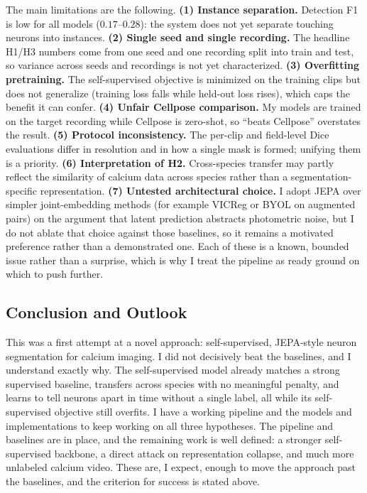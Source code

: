\documentclass[twoside,11pt]{article}
\begin{document}
The main limitations are the following. \textbf{(1) Instance separation.} Detection F1 is low for all
models ($0.17$--$0.28$): the system does not yet separate touching neurons into instances. \textbf{(2) Single seed and
single recording.} The headline H1/H3 numbers come from one seed and one recording split into train
and test, so variance across seeds and recordings is not yet characterized. \textbf{(3) Overfitting
pretraining.} The self-supervised objective is minimized on the training clips but does not generalize
(training loss falls while held-out loss rises), which caps the benefit it can confer. \textbf{(4) Unfair Cellpose comparison.} My models
are trained on the target recording while Cellpose is zero-shot, so ``beats Cellpose'' overstates the
result. \textbf{(5) Protocol inconsistency.} The per-clip and field-level Dice evaluations differ in
resolution and in how a single mask is formed; unifying them is a priority. \textbf{(6) Interpretation
of H2.} Cross-species transfer may partly reflect the similarity of calcium data across species rather
than a segmentation-specific representation. \textbf{(7) Untested architectural choice.} I adopt JEPA
over simpler joint-embedding methods (for example VICReg or BYOL on augmented pairs) on the argument
that latent prediction abstracts photometric noise, but I do not ablate that choice against those
baselines, so it remains a motivated preference rather than a demonstrated one. Each of these is a
known, bounded issue rather than a surprise, which is why I treat the pipeline as ready ground on which
to push further.

\subsection{Conclusion and Outlook}
\label{sec:conclusion}

This was a first attempt at a novel approach: self-supervised, JEPA-style neuron segmentation for
calcium imaging. I did not decisively beat the baselines, and I understand exactly why. The
self-supervised model already matches a strong supervised baseline, transfers across species with no
meaningful penalty, and learns to tell neurons apart in time without a single label, all while its
self-supervised objective still overfits. I have a working pipeline and the
models and implementations to keep working on all three hypotheses. The pipeline and baselines are in
place, and the remaining work is well defined: a stronger self-supervised backbone, a direct attack on
representation collapse, and much more unlabeled calcium video. These are, I expect, enough to move the
approach past the baselines, and the criterion for success is stated above.

\vskip 0.2in

\end{document}
